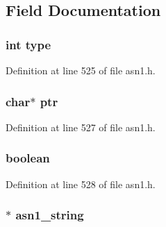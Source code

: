\subsection{Field Documentation}
\subsubsection[{\texorpdfstring{type}{type}}]{\setlength{\rightskip}{0pt plus 5cm}int type}\hypertarget{structasn1__type__st_ac765329451135abec74c45e1897abf26}{}\label{structasn1__type__st_ac765329451135abec74c45e1897abf26}


Definition at line 525 of file asn1.\+h.

\subsubsection[{\texorpdfstring{ptr}{ptr}}]{\setlength{\rightskip}{0pt plus 5cm}char$\ast$ ptr}\hypertarget{structasn1__type__st_a935adc2e417a61d7eb6f04efb18ba031}{}\label{structasn1__type__st_a935adc2e417a61d7eb6f04efb18ba031}


Definition at line 527 of file asn1.\+h.

\subsubsection[{\texorpdfstring{boolean}{boolean}}]{ boolean}\hypertarget{structasn1__type__st_a14e2ea490f3d04965733f623003aed68}{}\label{structasn1__type__st_a14e2ea490f3d04965733f623003aed68}


Definition at line 528 of file asn1.\+h.

\subsubsection[{\texorpdfstring{asn1\+\_\+string}{asn1_string}}]{$\ast$ asn1\+\_\+string}\hypertarget{structasn1__type__st_ab09b0caaa3250409130212f7234cdcf5}{}\label{structasn1__type__st_ab09b0caaa3250409130212f7234cdcf5}


